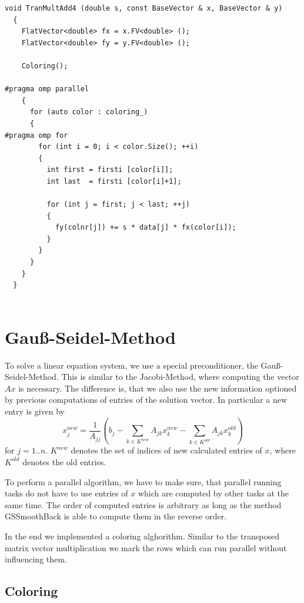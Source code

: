 \documentclass[a4paper,11pt]{scrartcl}
\begin{document}
\begin{lstlisting}
void TranMultAdd4 (double s, const BaseVector & x, BaseVector & y)
  {
    FlatVector<double> fx = x.FV<double> ();
    FlatVector<double> fy = y.FV<double> ();

    Coloring();

#pragma omp parallel
    {
      for (auto color : coloring_)
      {
#pragma omp for
        for (int i = 0; i < color.Size(); ++i)
        {
          int first = firsti [color[i]];
          int last  = firsti [color[i]+1];

          for (int j = first; j < last; ++j)
          {
            fy(colnr[j]) += s * data[j] * fx(color[i]);
          }
        }
      }
    }
  }


\end{lstlisting}

\section{Gauß-Seidel-Method}
To solve a linear equation system, we use a special preconditioner, the 
Gauß-Seidel-Method. This is similar to the Jacobi-Method, where computing
 the vector $Ax$ is necessary. The difference is,
that we also use the new information optioned by previous computations of
entries of the solution vector. In particular a new entry is given by
$$ x_j^{new} = \frac{1}{A_{jj}} \left(b_{j} - \sum_{k \in K^{new}}A_{jk}
 x_k^{new} - \sum_{k \in K^{old}}A_{jk} x_k^{old}\right)$$
for $j = 1..n$. $K^{new}$ denotes the set of indices of new calculated entries
 of $x$, where $K^{old}$ denotes the old entries.

To perform a parallel algorithm, we have to make sure, that parallel 
running tasks do not have to use entries of $x$ which are computed by other
tasks at the same time. The order of computed entries is arbitrary as long as
the method GSSmoothBack is able to compute them in the reverse order.
 
In the end we implemented a coloring alghorithm.
Similar to the transposed matrix vector multiplication we mark the rows which
can run parallel without influencing them.

\subsection{Coloring}
\end{document}
